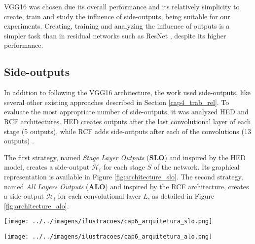 VGG16 was chosen due its overall performance and its relatively simplicity to create, train and study the influence of side-outputs, being suitable for our experiments. 
Creating, training and analyzing the influence of outputs is a simpler task than in residual networks such as ResNet \cite{RESNET:2016:7780459}, despite its higher performance.

\subsection{Side-outputs}
\label{cap5_saidas_laterais}

In addition to following the VGG16 architecture, the work used side-outputs, like several other existing approaches described in Section \ref{cap4_trab_rel}.
To evaluate the most appropriate number of side-outputs, it was analyzed HED and RCF architectures.
HED creates outputs after the last convolutional layer of each stage (5 outputs), while RCF adds side-outputs after each of the convolutions (13 outputs) \cite{HED:2015} \cite{RCF:2017:8100105}.

The first strategy, named \textit{Stage Layer Outputs} (\textbf{SLO}) and inspired by the HED model, creates a side-output $\mathcal{H}_i$ for each stage $S$ of the network.
Its graphical representation is available in Figure \ref{fig:architecture_slo}.
The second strategy, named \textit{All Layers Outputs} (\textbf{ALO}) and inspired by the RCF architecture, creates a side-output $\mathcal{H}_i$ for each convolutional layer $L$, as detailed in Figure \ref{fig:architecture_alo}.

\begin{figure*}
  \centering
  \caption{SLO Neural Network Architecture.}
  \texttt{[image: ../../imagens/ilustracoes/cap6\_arquitetura\_slo.png]}
  \sourceOwn
  \label{fig:architecture_slo}
\end{figure*}

\begin{figure*}
  \centering
  \caption{ALO Neural Network Architecture.}
  \texttt{[image: ../../imagens/ilustracoes/cap6\_arquitetura\_alo.png]}
  \sourceOwn
  \label{fig:architecture_alo}
\end{figure*}

% 

